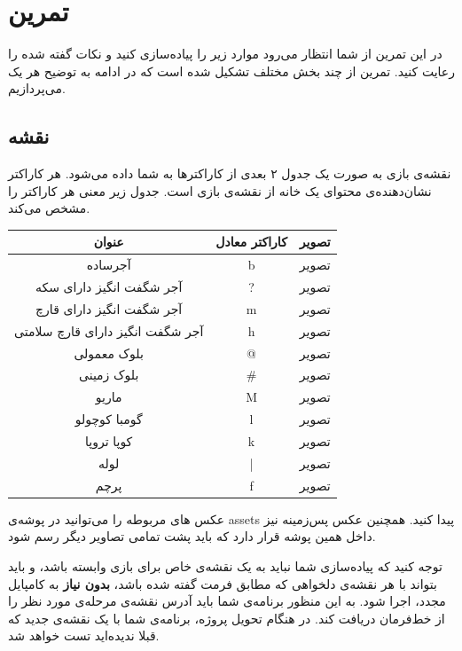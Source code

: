 \documentclass{utap}
\begin{document}
	\section{تمرین}
در این تمرین از شما انتظار می‌رود موارد زیر را پیاده‌سازی کنید و نکات گفته شده را رعایت کنید. تمرین از چند بخش مختلف تشکیل شده است که در ادامه به توضیح هر یک می‌پردازیم.

	\subsection{نقشه}
نقشه‌ی بازی به صورت یک جدول ۲ بعدی از کاراکترها به شما داده می‌شود. هر کاراکتر نشان‌دهنده‌ی محتوای یک خانه  از نقشه‌ی بازی است. جدول زیر معنی هر کاراکتر را مشخص می‌کند.
	\begin{table}[H]
		\centering
		\begin{tabular}{ccc}
			\hline
			عنوان & کاراکتر معادل & تصویر\\
			\hline
			آجر‌ساده & b & تصویر\\
			\hline
			آجر شگفت انگیز دارای سکه & ? & تصویر\\
			\hline
			آجر شگفت انگیز دارای قارچ & m & تصویر\\
			\hline
			آجر شگفت انگیز دارای قارچ سلامتی & h & تصویر\\
			\hline
			بلوک معمولی & @ & تصویر\\
			\hline
			بلوک زمینی & \# & تصویر\\
			\hline
			ماریو & M & تصویر\\
			\hline
			گومبا کوچولو & l & تصویر\\
			\hline
			کوپا تروپا & k & تصویر\\
			\hline
			لوله  & | & تصویر\\
			\hline
			پرچم & f & تصویر\\
			\hline
		\end{tabular}
	\end{table}
عکس های مربوطه را می‌توانید در پوشه‌ی assets پیدا کنید. همچنین عکس پس‌زمینه‌ نیز داخل همین پوشه قرار دارد که باید پشت تمامی تصاویر دیگر رسم شود.

توجه کنید که پیاده‌سازی شما نباید به یک نقشه‌ی خاص برای بازی وابسته باشد، و باید بتواند با هر نقشه‌ی دلخواهی که مطابق فرمت گفته شده باشد، \textbf{بدون نیاز} به کامپایل مجدد، اجرا شود. به این  منظور برنامه‌ی شما باید آدرس نقشه‌ی مرحله‌ی مورد نظر را از خط‌فرمان دریافت کند. در هنگام تحویل پروژه، برنامه‌ی شما با یک نقشه‌ی جدید که قبلا ندیده‌اید تست خواهد شد.
\end{document}
